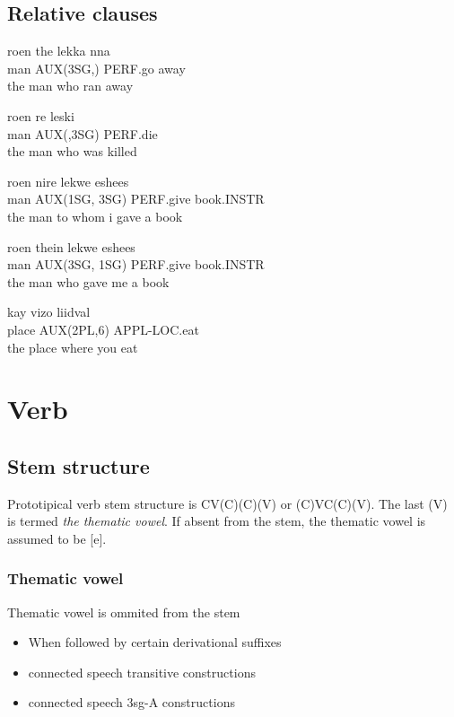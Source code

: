 \documentclass[8pt]{book}
\begin{document}
\section{Relative clauses}

\begin{exe}
\ex
\gll roen the lekka nna \\
 man AUX(3SG,) PERF.go away \\
\trans the man who ran away

\ex
\gll roen re leski \\
man AUX(,3SG) PERF.die \\
\trans the man who was killed


\ex
\gll roen nire lekwe eshees \\
man AUX(1SG, 3SG) PERF.give book.INSTR \\
\trans the man to whom i gave a book

\ex
\gll roen thein lekwe eshees \\
man AUX(3SG, 1SG) PERF.give book.INSTR \\
\trans the man who gave me a book

\ex
\gll kay vizo liidval \\
place AUX(2PL,6) APPL-LOC.eat \\
\trans the place where you eat
\end{exe}



\chapter{Verb}

\section{Stem structure}

Prototipical verb stem structure is CV(C)(C)(V) or (C)VC(C)(V). The last (V) is termed \textit{the thematic vowel}. If absent from the stem, the thematic vowel is assumed to be [e].

\subsection{Thematic vowel}
Thematic vowel is ommited from the stem
\begin{itemize}
	\item When followed by certain derivational suffixes
	\item connected speech transitive constructions
	\item connected speech 3sg-A constructions
\end{itemize}
\end{document}
